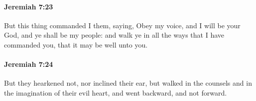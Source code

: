 		\paragraph{Jeremiah 7:23} %
			\label{JEREMIAH-7-23}

			But this thing commanded I them, saying, Obey my voice, and I will be your God, and ye shall be my people: and walk ye in all the ways that I have commanded you, that it may be well unto you.


		\paragraph{Jeremiah 7:24} %
			\label{JEREMIAH-7-24}

			But they hearkened not, nor inclined their ear, but walked in the counsels and in the imagination of their evil heart, and went backward, and not forward.


